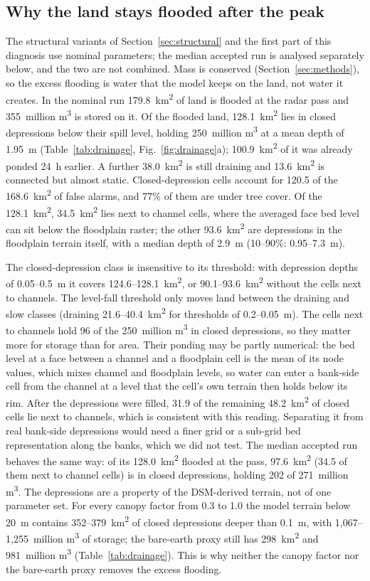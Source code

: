 \documentclass[preprint,12pt,authoryear]{elsarticle}
\newcommand{\kmsq}{km\textsuperscript{2}}
\newcommand{\Mcm}{million m\textsuperscript{3}}
\begin{document}
\subsection{Why the land stays flooded after the peak}
\label{sec:drainage}
The structural variants of Section~\ref{sec:structural} and the first part of this diagnosis use nominal parameters; the median accepted run is analysed separately below, and the two are not combined.
Mass is conserved (Section~\ref{sec:methods}), so the excess flooding is water that the model keeps on the land, not water it creates. In the nominal run 179.8~\kmsq{} of land is flooded at the radar pass and 355~\Mcm{} is stored on it. Of the flooded land, 128.1~\kmsq{} lies in closed depressions below their spill level, holding 250~\Mcm{} at a mean depth of 1.95~m (Table~\ref{tab:drainage}, Fig.~\ref{fig:drainage}a); 100.9~\kmsq{} of it was already ponded 24~h earlier. A further 38.0~\kmsq{} is still draining and 13.6~\kmsq{} is connected but almost static. Closed-depression cells account for 120.5 of the 168.6~\kmsq{} of false alarms, and 77\% of them are under tree cover. Of the 128.1~\kmsq, 34.5~\kmsq{} lies next to channel cells, where the averaged face bed level can sit below the floodplain raster; the other 93.6~\kmsq{} are depressions in the floodplain terrain itself, with a median depth of 2.9~m (10--90\%: 0.95--7.3~m).

The closed-depression class is insensitive to its threshold: with depression depths of 0.05--0.5~m it covers 124.6--128.1~\kmsq, or 90.1--93.6~\kmsq{} without the cells next to channels. The level-fall threshold only moves land between the draining and slow classes (draining 21.6--40.4~\kmsq{} for thresholds of 0.2--0.05~m). The cells next to channels hold 96 of the 250~\Mcm{} in closed depressions, so they matter more for storage than for area. Their ponding may be partly numerical: the bed level at a face between a channel and a floodplain cell is the mean of its node values, which mixes channel and floodplain levels, so water can enter a bank-side cell from the channel at a level that the cell's own terrain then holds below its rim. After the depressions were filled, 31.9 of the remaining 48.2~\kmsq{} of closed cells lie next to channels, which is consistent with this reading. Separating it from real bank-side depressions would need a finer grid or a sub-grid bed representation along the banks, which we did not test. The median accepted run behaves the same way: of its 128.0~\kmsq{} flooded at the pass, 97.6~\kmsq{} (34.5 of them next to channel cells) is in closed depressions, holding 202 of 271~\Mcm. The depressions are a property of the DSM-derived terrain, not of one parameter set. For every canopy factor from 0.3 to 1.0 the model terrain below 20~m contains 352--379~\kmsq{} of closed depressions deeper than 0.1~m, with 1,067--1,255~\Mcm{} of storage; the bare-earth proxy still has 298~\kmsq{} and 981~\Mcm{} (Table~\ref{tab:drainage}). This is why neither the canopy factor nor the bare-earth proxy removes the excess flooding.
\end{document}
